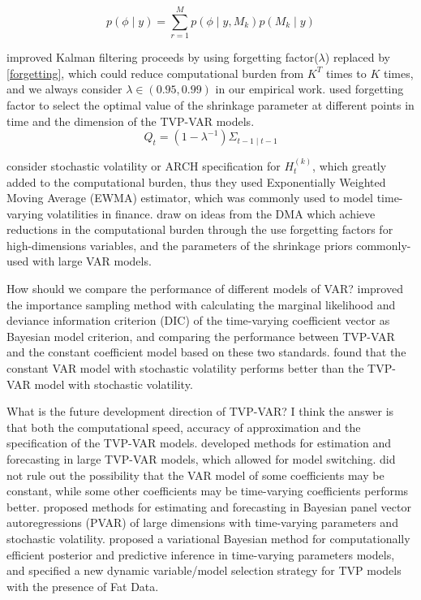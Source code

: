 \documentclass[11pt]{article}
\begin{document}
\begin{equation}
	p(\phi \mid y)=\sum_{r=1}^{M} p\left(\phi \mid y, M_{k}\right) p\left(M_{k} \mid y\right)
	\label{model_por}
\end{equation}

\cite{raftery2010online} improved Kalman filtering proceeds by using forgetting factor($\lambda $)  replaced by \eqref{forgetting}, 
which could reduce computational burden from $K^T$ times to $K$ times,
and we always consider $\lambda \in (0.95, 0.99) $ in  our empirical work.
\cite{koop2013large} used forgetting factor to select the optimal value of the shrinkage parameter at different points in time 
and the dimension of the TVP-VAR models. 
\begin{equation}
	Q_{t}=\left(1-\lambda^{-1}\right) \Sigma_{t-1 \mid t-1}
	\label{forgetting}
\end{equation}

\cite{koop2012forecasting} consider
stochastic volatility or ARCH specification for $H_t^{(k)}$, 
which greatly  added to the computational burden, thus they used Exponentially Weighted Moving Average (EWMA) estimator,
which was commonly used to model time-varying volatilities in finance.
\cite{koop2013large} draw on ideas from the DMA  which achieve
reductions in the computational burden through the use forgetting factors for high-dimensions variables,
and the parameters of the shrinkage priors commonly-used with large VAR models.

How should we compare the performance of different models of VAR? \cite{chan2018bayesian} 
improved the importance sampling method with calculating the marginal likelihood and
deviance information criterion (DIC) of the time-varying coefficient vector as Bayesian model criterion, and comparing the performance between 
TVP-VAR and the constant coefficient model based on these two standards.
\cite{chan2018bayesian} found that the  constant VAR model with stochastic volatility performs better than the TVP-VAR model with stochastic volatility.


What is the future development direction of TVP-VAR?  I think the answer is that both the computational speed, 
accuracy of  approximation and the specification of the TVP-VAR models.
\cite{koop2013large} developed methods for estimation and forecasting in large TVP-VAR models, which allowed for model switching.
\cite{chan2018bayesian} did not rule out the possibility that the VAR model of some coefficients may be constant, 
while some other coefficients may be time-varying coefficients performs better.
\cite{koop2019forecasting} proposed methods for estimating and forecasting in Bayesian panel vector autoregressions (PVAR)
of large dimensions with time-varying parameters and stochastic volatility. 
\cite{koop2020bayesian} proposed a variational Bayesian  method for computationally efficient
posterior and predictive inference in time-varying parameters models, and specified a new dynamic variable/model selection strategy for TVP
models with the presence of Fat Data. 
\end{document}
